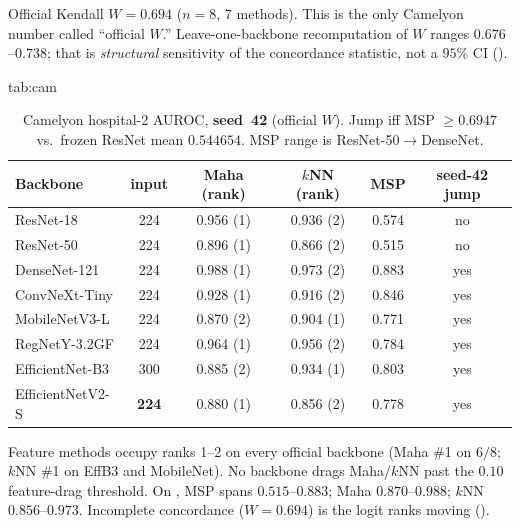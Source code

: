 \documentclass[anon]{midl}
\begin{document}
Official Kendall $W=\mathbf{0.694}$ ($n{=}8$, 7 methods).
This is the only Camelyon number called ``official $W$.''
Leave-one-backbone recomputation of $W$ ranges $0.676$--$0.738$; that is \emph{structural} sensitivity of the concordance statistic, not a $95\%$ CI ().

\begin{table}[t]
\floatconts
  {tab:cam}
  {\caption{Camelyon hospital-2 AUROC, \textbf{seed~42} (official $W$).
  Jump iff MSP ${\ge}0.6947$ vs.\ frozen ResNet mean $0.544654$.
  MSP range is ResNet-50${\to}$DenseNet.}}
  {\small
  \begin{tabular}{@{}lccccc@{}}
  \toprule
  Backbone & input & Maha (rank) & $k$NN (rank) & MSP & seed-42 jump \\
  \midrule
  ResNet-18 & 224 & 0.956 (1) & 0.936 (2) & 0.574 & no \\
  ResNet-50 & 224 & 0.896 (1) & 0.866 (2) & 0.515 & no \\
  DenseNet-121 & 224 & 0.988 (1) & 0.973 (2) & 0.883 & yes \\
  ConvNeXt-Tiny & 224 & 0.928 (1) & 0.916 (2) & 0.846 & yes \\
  MobileNetV3-L & 224 & 0.870 (2) & 0.904 (1) & 0.771 & yes \\
  RegNetY-3.2GF & 224 & 0.964 (1) & 0.956 (2) & 0.784 & yes \\
  EfficientNet-B3 & 300 & 0.885 (2) & 0.934 (1) & 0.803 & yes \\
  EfficientNetV2-S & \textbf{224} & 0.880 (1) & 0.856 (2) & 0.778 & yes \\
  \bottomrule
  \end{tabular}}
\end{table}

Feature methods occupy ranks 1--2 on every official backbone (Maha \#1 on $6/8$; $k$NN \#1 on EffB3 and MobileNet).
No backbone drags Maha/$k$NN past the $0.10$ feature-drag threshold.
On , MSP spans $0.515$--$0.883$; Maha $0.870$--$0.988$; $k$NN $0.856$--$0.973$.
Incomplete concordance ($W{=}0.694$) is the logit ranks moving ().
\end{document}

